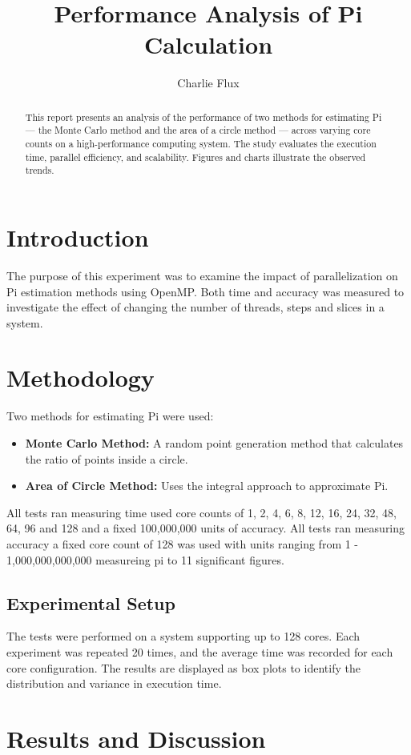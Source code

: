 \documentclass[conference]{IEEEtran}
\title{Performance Analysis of Pi Calculation}
\author{Charlie Flux}
\begin{document}
\maketitle

\begin{abstract}
This report presents an analysis of the performance of two methods for estimating Pi --- the Monte Carlo method and the area of a circle method --- across varying core counts on a high-performance computing system. The study evaluates the execution time, parallel efficiency, and scalability. Figures and charts illustrate the observed trends.
\end{abstract}

\section{Introduction}
The purpose of this experiment was to examine the impact of parallelization on Pi estimation methods using OpenMP.
Both time and accuracy was measured to investigate the effect of changing the number of threads, steps and slices in a system.
\section{Methodology}
Two methods for estimating Pi were used:
\begin{itemize}
    \item \textbf{Monte Carlo Method:} A random point generation method that calculates the ratio of points inside a circle.
    \item \textbf{Area of Circle Method:} Uses the integral approach to approximate Pi.
\end{itemize}
All tests ran measuring time used core counts of 1, 2, 4, 6, 8, 12, 16, 24, 32, 48, 64, 96 and 128 and a fixed 100,000,000 units of accuracy.
All tests ran measuring accuracy a fixed core count of 128 was used with units ranging from 1 - 1,000,000,000,000 measureing pi to 11 significant figures.

\subsection{Experimental Setup}
The tests were performed on a system supporting up to 128 cores. Each experiment was repeated 20 times, and the average time was recorded for each core configuration. The results are displayed as box plots to identify the distribution and variance in execution time.

\section{Results and Discussion}
\end{document}
